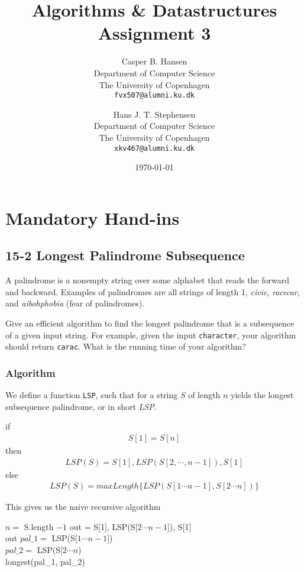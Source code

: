 \documentclass[11pt,english]{article}
\title
{
	\vspace{1in}
	Algorithms \& Datastructures\\
	\huge Assignment 3
}
\author
{
	Casper B. Hansen\\
	\small Department of Computer Science\\
	\small The University of Copenhagen\\
	\texttt{fvx507@alumni.ku.dk}
	\and
	Hans J. T. Stephensen\\
	\small Department of Computer Science\\
	\small The University of Copenhagen\\
	\texttt{xkv467@alumni.ku.dk}
}
\date{\today}
\begin{document}
\clearpage
\maketitle
\thispagestyle{empty}


\newpage
\pagestyle{fancy}

\section*{Mandatory Hand-ins}

\subsection*{15-2 Longest Palindrome Subsequence}
\large{A palindrome is a nonempty string over some alphabet that reads the
forward and backward. Examples of palindromes are all strings of length 1,
\textit{civic}, \textit{racecar}, and \textit{aibohphobia} (fear of
palindromes).

Give an efficient algorithm to find the longest palindrome that is a
subsequence of a given input string. For example, given the input
\texttt{character}, your algorithm should return \texttt{carac}. What is the
running time of your algorithm?}

\subsubsection*{Algorithm}
We define a function \texttt{LSP}, such that for a string $S$ of length $n$
yields the longest subsequence palindrome, or in short \textit{LSP}.

if
\begin{align*}
S[1] = S[n]
\end{align*}
then
\begin{align*}
LSP(S) = S[1], LSP(S[2, \cdots , n-1]), S[1]
\end{align*}
else
\begin{align*}
LSP(S) = maxLength\{ LSP(S[1 \cdots n-1], S[2 \cdots n]) \}
\end{align*}

\noindent
This gives us the naive recursive algorithm

\begin{algorithm}
	
	\BlankLine
	
	$n = $ S.length $-1$ 
	{   
	    out = S[1], LSP(S[$2 \cdots n-1$]), S[1] \\
		\Return out
	}	
	$pal\_1 =$ LSP(S[$1 \cdots n-1$]) \\
	$pal\_2 =$ LSP(S[$2 \cdots n$) \\
	\Return longest(pal\_1, pal\_2)
\end{algorithm}
\end{document}
